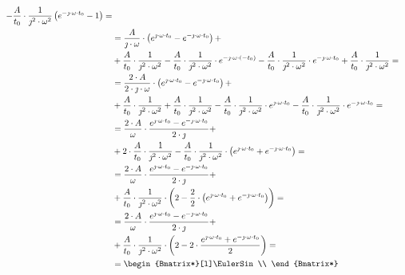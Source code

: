 \begin{task}
\begin{align*}
-\frac{A}{t_{0}}\cdot \frac{1}{\jmath^{2} \cdot \omega^{2}} \left(e^{ -\jmath \cdot \omega \cdot t_{0}}-1\right)=\\
&= \frac{A}{\jmath \cdot \omega}\cdot \left( e^{ \jmath \cdot \omega \cdot t_{0}} - e^{ -\jmath \cdot \omega \cdot t_{0}} \right)+\\
&+ \frac{A}{t_{0}}\cdot \frac{1}{\jmath^{2} \cdot \omega^{2}}  - \frac{A}{t_{0}}\cdot \frac{1}{\jmath^{2} \cdot \omega^{2}} \cdot e^{ -\jmath \cdot \omega \cdot (-t_{0})} -\frac{A}{t_{0}}\cdot \frac{1}{\jmath^{2} \cdot \omega^{2}} \cdot e^{ -\jmath \cdot \omega \cdot t_{0}} + \frac{A}{t_{0}}\cdot \frac{1}{\jmath^{2} \cdot \omega^{2}}=\\
&= \frac{2\cdot A}{2\cdot \jmath \cdot \omega}\cdot \left( e^{ \jmath \cdot \omega \cdot t_{0}} - e^{ -\jmath \cdot \omega \cdot t_{0}} \right)+\\
&+ \frac{A}{t_{0}}\cdot \frac{1}{\jmath^{2} \cdot \omega^{2}}  + \frac{A}{t_{0}}\cdot \frac{1}{\jmath^{2} \cdot \omega^{2}}  - \frac{A}{t_{0}}\cdot \frac{1}{\jmath^{2} \cdot \omega^{2}} \cdot e^{\jmath \cdot \omega \cdot t_{0}} -\frac{A}{t_{0}}\cdot \frac{1}{\jmath^{2} \cdot \omega^{2}} \cdot e^{ -\jmath \cdot \omega \cdot t_{0}}=\\
&= \frac{2\cdot A}{\omega}\cdot \frac{e^{ \jmath \cdot \omega \cdot t_{0}} - e^{ -\jmath \cdot \omega \cdot t_{0}}}{2\cdot \jmath}+\\
&+ 2\cdot \frac{A}{t_{0}}\cdot \frac{1}{\jmath^{2} \cdot \omega^{2}}  - \frac{A}{t_{0}}\cdot \frac{1}{\jmath^{2} \cdot \omega^{2}} \cdot \left(e^{ \jmath \cdot \omega \cdot t_{0}} +e^{ -\jmath \cdot \omega \cdot t_{0}}\right)=\\
&= \frac{2\cdot A}{\omega}\cdot \frac{e^{ \jmath \cdot \omega \cdot t_{0}} - e^{ -\jmath \cdot \omega \cdot t_{0}}}{2\cdot \jmath}+\\
&+ \frac{A}{t_{0}}\cdot \frac{1}{\jmath^{2} \cdot \omega^{2}} \cdot \left(2  - \frac{2}{2}\cdot \left(e^{ \jmath \cdot \omega \cdot t_{0}} +e^{ -\jmath \cdot \omega \cdot t_{0}}\right)\right)=\\
&= \frac{2\cdot A}{\omega}\cdot \frac{e^{ \jmath \cdot \omega \cdot t_{0}} - e^{ -\jmath \cdot \omega \cdot t_{0}}}{2\cdot \jmath}+\\
&+ \frac{A}{t_{0}}\cdot \frac{1}{\jmath^{2} \cdot \omega^{2}} \cdot \left(2  - 2\cdot \frac{e^{ \jmath \cdot \omega \cdot t_{0}} +e^{ -\jmath \cdot \omega \cdot t_{0}}}{2}\right)=\\
&=\begin{Bmatrix*}[l]%
\EulerSin\\

\end{Bmatrix*}
\end{align*}
\end{task}

